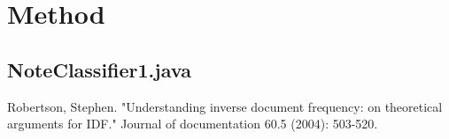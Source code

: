 \documentclass[11pt]{article}
\begin{document}
\section{Method}
\subsection{NoteClassifier1.java}


\begin{thebibliography}{1}

Robertson, Stephen. "Understanding inverse document frequency: on theoretical arguments for IDF." Journal of documentation 60.5 (2004): 503-520.

\end{thebibliography}
\end{document}
